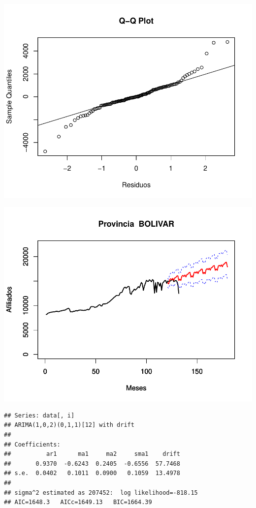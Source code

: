 \documentclass[11pt,a4paper,oneside]{article}\usepackage[]{graphicx}\usepackage[]{color}
\makeatletter
\def\maxwidth{ %
  \ifdim\Gin@nat@width>\linewidth
    \linewidth
  \else
    \Gin@nat@width
  \fi
}
\newenvironment{kframe}{%
 \def\at@end@of@kframe{}%
 \ifinner\ifhmode%
  \def\at@end@of@kframe{\end{minipage}}%
  \begin{minipage}{\columnwidth}%
 \fi\fi%
 \def\FrameCommand##1{\hskip\@totalleftmargin \hskip-\fboxsep
 \colorbox{shadecolor}{##1}\hskip-\fboxsep
     \hskip-\linewidth \hskip-\@totalleftmargin \hskip\columnwidth}%
 \MakeFramed {\advance\hsize-\width
   \@totalleftmargin\z@ \linewidth\hsize
   \@setminipage}}%
 {\par\unskip\endMakeFramed%
 \at@end@of@kframe}
\newenvironment{knitrout}{}{} %
\makeatother
\begin{document}
\begin{knitrout}
{}




{\centering \includegraphics[width=\maxwidth]{figure/unnamed-chunk-16-3} 

}




{\centering \includegraphics[width=\maxwidth]{figure/unnamed-chunk-16-4} 

}


\begin{kframe}\begin{verbatim}
## Series: data[, i] 
## ARIMA(1,0,2)(0,1,1)[12] with drift         
## 
## Coefficients:
##          ar1      ma1     ma2     sma1    drift
##       0.9370  -0.6243  0.2405  -0.6556  57.7468
## s.e.  0.0402   0.1011  0.0900   0.1059  13.4978
## 
## sigma^2 estimated as 207452:  log likelihood=-818.15
## AIC=1648.3   AICc=1649.13   BIC=1664.39
\end{verbatim}
\end{kframe}


\end{knitrout}
\end{document}
